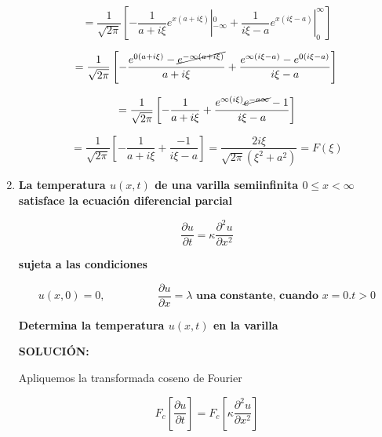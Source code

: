 \documentclass[12pt,a4paper]{article}
\begin{document}
\begin{enumerate}
    \begin{equation*}
        =  \frac{1}{ \sqrt{2\pi}} \left[-\frac{1}{a+i\xi} e^{x(a+i\xi)}|_{-\infty}^{0} + \frac{1}{i\xi -a} e^{x(i\xi -a)} |_{0}^{\infty} \right]
    \end{equation*}
    
    \begin{equation*}
        =  \frac{1}{ \sqrt{2\pi}} \left[-\frac{e^{0(a+i\xi)}-\cancel{e^{-\infty(a+i\xi)}}}{a+i\xi} + \frac{e^{\infty(i\xi -a)}-e^{0(i\xi -a)}}{i\xi -a}  \right]
    \end{equation*}
    
    \begin{equation*}
        =  \frac{1}{ \sqrt{2\pi}} \left[-\frac{1}{a+i\xi} + \frac{e^{\infty(i\xi)}\cancel{e^{-a\infty}}-1}{i\xi -a}  \right]
    \end{equation*}
    
    \begin{equation*}
        =  \frac{1}{ \sqrt{2\pi}} \left[-\frac{1}{a+i\xi} + \frac{-1}{i\xi -a}  \right]=\frac{2i\xi}{\sqrt{2\pi}(\xi^2+a^2)} =F(\xi)
    \end{equation*}
    
    
    
    
    
    
    
    \item\textbf{La temperatura $u(x,t)$ de una varilla semiinfinita $0\leq x< \infty$ satisface la ecuación diferencial parcial}
    
    \begin{equation*}
        \frac{\partial u}{\partial t} = \kappa \frac{\partial^2 u}{\partial x^2}
    \end{equation*}
    
    \textbf{sujeta a las condiciones}
    
    \begin{equation*}
        u(x,0)=0, \hspace{2cm} \frac{\partial u}{\partial x}= \lambda \textbf{ una constante, cuando }x=0.t>0
    \end{equation*}
    
    \textbf{Determina la temperatura $u(x,t)$ en la varilla}
    
    \textbf{SOLUCIÓN:}
    
    Apliquemos la transformada coseno de Fourier
    
    \begin{equation*}
        F_c\left[\frac{\partial u}{\partial t}\right] = F_c\left[\kappa \frac{\partial^2 u}{\partial x^2}\right]
    \end{equation*}
    

\end{enumerate}
\end{document}
